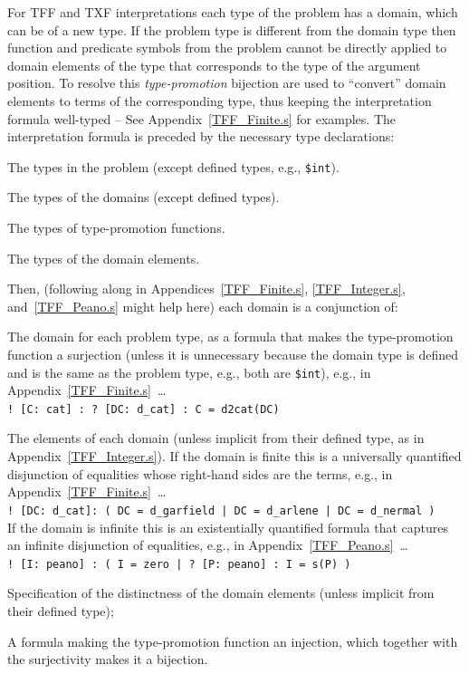 \documentclass{easychair}
\newcommand{\smalltt}[1]{\small \texttt{#1}}
\newenvironment{packed_itemize}{
\vspace*{-0.2em}
\begin{itemize}
\setlength{\partopsep}{0pt}
\setlength{\itemsep}{1pt}
\setlength{\parskip}{0pt}
\setlength{\parsep}{0pt}
}{\end{itemize}}
\begin{document}
For TFF and TXF interpretations each type of the problem has a domain, which can be of a new type.
If the problem type is different from the domain type then function and predicate symbols from 
the problem cannot be directly applied to domain elements of the type that corresponds to the type
of the argument position.
To resolve this {\em type-promotion} bijection are used to ``convert'' domain elements to terms 
of the corresponding type, thus keeping the interpretation formula well-typed -- See
Appendix~\ref{TFF_Finite.s} for examples.
The interpretation formula is preceded by the necessary type declarations:
\begin{packed_itemize}
\item The types in the problem (except defined types, e.g., {\smalltt{\$int}}).
\item The types of the domains (except defined types).
\item The types of type-promotion functions.
\item The types of the domain elements.
\end{packed_itemize}
Then, (following along in Appendices~\ref{TFF_Finite.s}, \ref{TFF_Integer.s}, and~\ref{TFF_Peano.s} 
might help here) each domain is a conjunction of:
\begin{packed_itemize}
\item The domain for each problem type, as a formula that makes the type-promotion function a 
      surjection (unless it is unnecessary because the domain type is defined and is the same as 
      the problem type, e.g., both are {\smalltt{\$int}}), e.g., in 
      Appendix~\ref{TFF_Finite.s}~\ldots\\
      \hspace*{0.5cm}\smalltt{! [C: cat] : ? [DC: d\_cat] : C = d2cat(DC)}
\item The elements of each domain (unless implicit from their defined type, as in
      Appendix~\ref{TFF_Integer.s}). 
      If the domain is finite this is a universally quantified disjunction of equalities whose 
      right-hand sides are the terms, e.g., in Appendix~\ref{TFF_Finite.s}~\ldots\\
      \hspace*{0.5cm}\smalltt{! [DC: d\_cat]: ( DC = d\_garfield | DC = d\_arlene | DC = d\_nermal )}\\
      If the domain is infinite this is an existentially quantified formula that captures an 
      infinite disjunction of equalities, e.g., in Appendix~\ref{TFF_Peano.s}~\ldots\\
      \hspace*{0.5cm}\smalltt{! [I: peano] : ( I = zero | ? [P: peano] : I = s(P) )}
\item Specification of the distinctness of the domain elements (unless implicit from their
      defined type);
\item A formula making the type-promotion function an injection,
      which together with the surjectivity makes it a bijection.
\end{packed_itemize}
\end{document}
